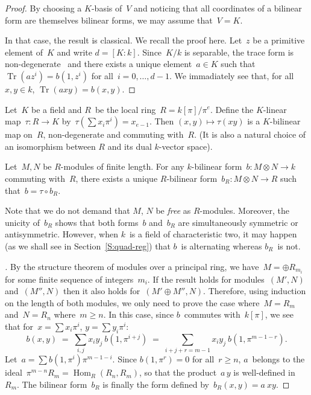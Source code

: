 \documentclass{lms}
\DeclareMathOperator\Hom{Hom}
\DeclareMathOperator\Tr{Tr}
\begin{document}
\begin{proof}
By choosing a $K$-basis of~$V$ and noticing that
all coordinates of a bilinear form are themselves bilinear forms,
we may assume that~$V = K$.

In that case, the result is classical. We recall the proof here.
Let~$z$ be a primitive element of~$K$ and write $d = [K:k]$.
Since~$K/k$ is separable, the trace form is
non-degenerate~\cite[VI~5.2]{lang-algebra}
and there exists a unique element~$a ∈ K$ such that
$\Tr (a z^i) = b(1, z^i)$ for all~$i=0, …, d-1$.
We immadiately see that, for all~$x, y ∈ k$, $\Tr (a x y) = b(x, y)$.

\end{proof}


Let~$K$ be a field and $R$~be the local ring~$R = k[π]/π^e$.
Define the $K$-linear map~$τ: R → K$ by~$τ(∑ x_i π^i) = x_{e-1}$.
Then $(x, y) ↦ τ(xy)$ is a $K$-bilinear map on~$R$,
non-degenerate and commuting with~$R$.
(It is also a natural choice of an isomorphism
between $R$ and its dual $k$-vector space).

\begin{lem}\label{lem:trace-local}
Let~$M, N$ be $R$-modules of finite length.
For any $k$-bilinear form~$b: M ⊗ N → k$ commuting with~$R$,
there exists a unique $R$-bilinear form~$b_R: M ⊗ N → R$
such that~$b = τ ∘ b_R$.
\end{lem}

Note that we do not demand that $M$, $N$ be \emph{free} as $R$-modules.
Moreover, the unicity of~$b_R$ shows that both forms~$b$ and~$b_R$ are
simultaneously symmetric or antisymmetric.
However, when $k$~is a field of characteristic two, it may happen (as we
shall see in Section~\ref{S:quad-reg}) that $b$~is alternating whereas
$b_R$~is not.

\begin{proof}[]
By the structure theorem of modules over a principal ring,
we have~$M = ⊕ R_{m_i}$ for some finite sequence of integers~$m_i$.
If the result holds for modules~$(M', N)$ and~$(M'', N)$ then
it also holds for~$(M' ⊕ M'', N)$.
Therefore, using induction on the length of both modules,
we only need to prove the case where~$M = R_m$ and~$N = R_n$ where~$m ≥ n$.
In this case, since $b$~commutes with~$k[π]$,
we see that for~$x = ∑ x_i π^i$, $y = ∑ y_i π^i$:
\begin{equation}
b(x,y) \;=\; ∑_{i,j} x_i y_j\: b(1, π^{i+j})
  \;=\; ∑_{i+j+r = m-1} x_i y_j\: b(1, π^{m-1-r}).
\end{equation}
Let~$a = ∑ b(1, π^{i}) π^{m-1-i}$. Since $b(1, π^{r}) = 0$ for all~$r ≥
n$, $a$~belongs to the ideal~$π^{m-n} R_m = \Hom_R (R_n, R_m)$, so that
the product~$a\,y$ is well-defined in~$R_m$. The bilinear form~$b_R$ is
finally the form defined by~$b_R(x,y) = a\:x y$.
\end{proof}
\end{document}
